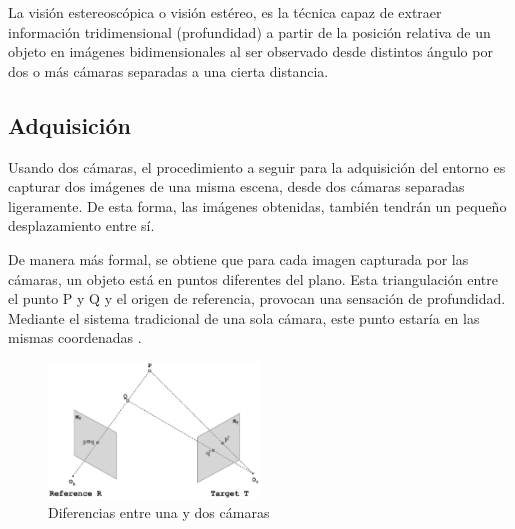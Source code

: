 

La visión estereoscópica o visión estéreo, es la técnica capaz de extraer
información tridimensional (profundidad) a partir de la posición relativa de un
objeto en imágenes bidimensionales al ser observado desde distintos ángulo por
dos o más cámaras separadas a una cierta distancia.


\subsection{Adquisición}

Usando dos cámaras, el procedimiento a seguir para la adquisición del entorno
es capturar dos imágenes de una misma escena, desde dos cámaras separadas
ligeramente. De esta forma, las imágenes obtenidas, también tendrán un pequeño 
desplazamiento entre sí.

De manera más formal, se obtiene que para cada imagen capturada por las
cámaras, un objeto está en puntos diferentes del plano. Esta triangulación
entre el punto P y Q y el origen de referencia, provocan una sensación de
profundidad. Mediante el sistema tradicional de una sola cámara, este punto
estaría en las mismas coordenadas \cite{VisionEstereo}.

\begin{figure}[!th]
  \begin{center}
    \includegraphics[width=0.5\textwidth]{images/cap2/VisionEstereo.eps}
    \caption{Diferencias entre una y dos cámaras}
    \label{fig:VisionEstereo}
  \end{center}
\end{figure}

